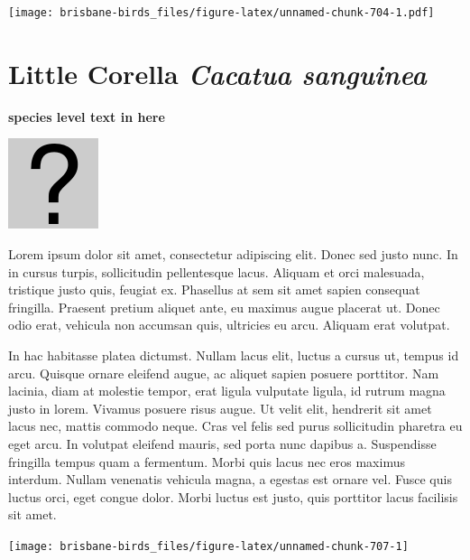 \documentclass[]{book}
\let\origfigure\figure
\let\endorigfigure\endfigure
\renewenvironment{figure}[1][2] {
  \expandafter\origfigure\expandafter[H]
} {
  \endorigfigure
}
\begin{document}
\begin{figure}
\centering
\texttt{[image: brisbane-birds\_files/figure-latex/unnamed-chunk-704-1.pdf]}
\caption{\label{fig:unnamed-chunk-704}insert figure caption}
\end{figure}

\section{\texorpdfstring{Little Corella \emph{Cacatua
sanguinea}}{Little Corella Cacatua sanguinea}}\label{little-corella-cacatua-sanguinea}

\textbf{species level text in here}

\begin{figure}
\centering
\includegraphics{assets/missing.png}
\caption{No image for species}
\end{figure}

Lorem ipsum dolor sit amet, consectetur adipiscing elit. Donec sed justo
nunc. In in cursus turpis, sollicitudin pellentesque lacus. Aliquam et
orci malesuada, tristique justo quis, feugiat ex. Phasellus at sem sit
amet sapien consequat fringilla. Praesent pretium aliquet ante, eu
maximus augue placerat ut. Donec odio erat, vehicula non accumsan quis,
ultricies eu arcu. Aliquam erat volutpat.

In hac habitasse platea dictumst. Nullam lacus elit, luctus a cursus ut,
tempus id arcu. Quisque ornare eleifend augue, ac aliquet sapien posuere
porttitor. Nam lacinia, diam at molestie tempor, erat ligula vulputate
ligula, id rutrum magna justo in lorem. Vivamus posuere risus augue. Ut
velit elit, hendrerit sit amet lacus nec, mattis commodo neque. Cras vel
felis sed purus sollicitudin pharetra eu eget arcu. In volutpat eleifend
mauris, sed porta nunc dapibus a. Suspendisse fringilla tempus quam a
fermentum. Morbi quis lacus nec eros maximus interdum. Nullam venenatis
vehicula magna, a egestas est ornare vel. Fusce quis luctus orci, eget
congue dolor. Morbi luctus est justo, quis porttitor lacus facilisis sit
amet.

\begin{figure}
\texttt{[image: brisbane-birds\_files/figure-latex/unnamed-chunk-707-1]} \caption{insert figure caption}\label{fig:unnamed-chunk-707}
\end{figure}
\end{document}
